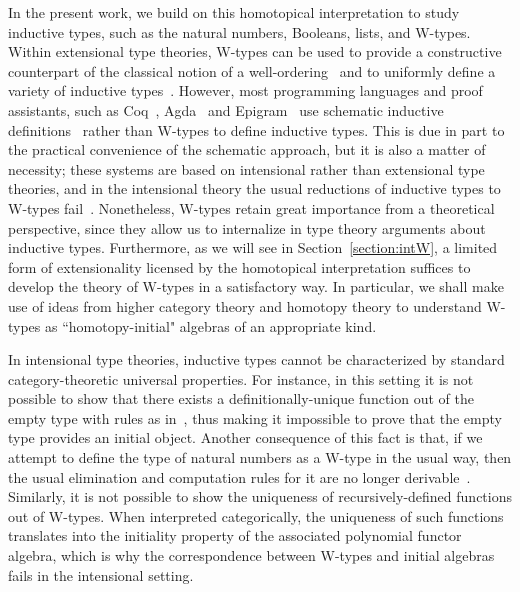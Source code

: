 \documentclass[reqno,10pt,a4paper,oneside]{amsart}
\numberwithin{equation}{section}
\theoremstyle{mythm}
\theoremstyle{mydef}
\theoremstyle{myrmk}
\begin{document}
In the present work, we build on this homotopical interpretation to study inductive types, such as the natural numbers, Booleans, lists, and W-types. Within extensional type theories, W-types can be used to  provide a constructive counterpart of the classical notion of a well-ordering~\cite{MartinLofP:inttt} and to uniformly define a variety of inductive types~\cite{DybjerP:repids}.
However, most programming languages and proof assistants, such as Coq~\cite{BertotY:inttpp}, Agda~\cite{NorellU:towppl} and Epigram~\cite{McBrideC:viefl} use schematic inductive definitions~\cite{CoquandT:inddt,PaulinMorhringC:inddsc} rather than W-types to define inductive types.  This is due in part to the practical convenience of the schematic approach, but it is also a matter of necessity; these systems are based on intensional rather than extensional type theories, and in the intensional theory the usual reductions of inductive types to W-types fail~\cite{DybjerP:repids,McBrideC:wtygnb}.
Nonetheless, W-types retain great importance from a theoretical perspective, since they allow us to internalize in type theory arguments about inductive types. Furthermore, as we will see in Section~\ref{section:intW}, a limited form of extensionality licensed by the homotopical interpretation suffices to develop the theory of W-types in a satisfactory way. In particular, we shall make use of ideas from higher category theory and homotopy theory to understand W-types as ``homotopy-initial" algebras of an appropriate kind.

\vspace{3cm}

In intensional type theories, inductive types cannot be characterized by standard category-theoretic
universal properties. For instance, in this setting it is not possible to show that there exists a 
definitionally-unique function out of the empty type with rules as in~\cite[Section~5.2]{NordstromB:marltt}, thus making it impossible to prove that the empty type provides an initial object. 
Another consequence of this fact is that, if we attempt to define the type of 
natural numbers as a W-type in the usual way, then 
the usual elimination and computation rules for it are no longer derivable~\cite{DybjerP:repids}. Similarly, it is not possible to show the uniqueness of recursively-defined functions out of W-types. When interpreted categorically, the uniqueness of such functions translates into the initiality property of the associated polynomial functor algebra, which is why the correspondence between W-types and initial algebras fails in the intensional setting.
\end{document}
